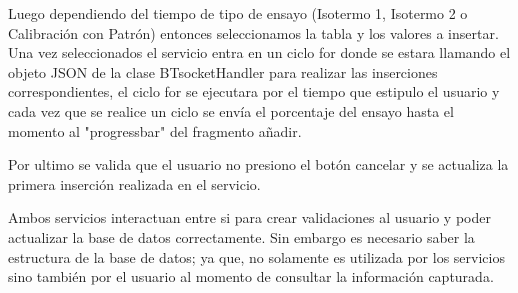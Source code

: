\par \noindent
Luego dependiendo del tiempo de tipo de ensayo (Isotermo 1, Isotermo 2 o Calibración con Patrón) entonces seleccionamos la tabla y los valores a insertar. Una vez seleccionados el servicio entra en un ciclo for donde se estara llamando el objeto JSON de la clase BTsocketHandler para realizar las inserciones correspondientes, el ciclo for se ejecutara por el tiempo que estipulo el usuario y cada vez que se realice un ciclo se envía el porcentaje del ensayo hasta el momento al "progressbar" del fragmento añadir.

\par \noindent
Por ultimo se valida que el usuario no presiono el botón cancelar y se actualiza la primera inserción realizada en el servicio.

\par \noindent
Ambos servicios interactuan entre si para crear validaciones al usuario y poder actualizar la base de datos correctamente. Sin embargo es necesario saber la estructura de la base de datos; ya que, no solamente es utilizada por los servicios sino también por el usuario al momento de consultar la información capturada. 

\clearpage